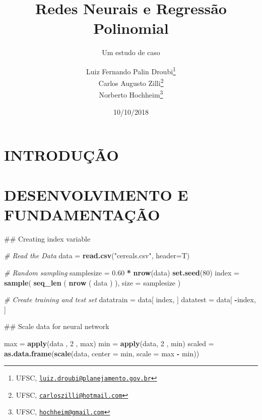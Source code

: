 \documentclass[a4paper, 12pt]{article}
\title{Redes Neurais e Regressão Polinomial}
\subtitle{Um estudo de caso}
\author{Luiz Fernando Palin Droubi\footnote{UFSC,
  \href{mailto:luiz.droubi@planejamento.gov.br}{\nolinkurl{luiz.droubi@planejamento.gov.br}}} \\ Carlos Augusto Zilli\footnote{UFSC,
  \href{mailto:carloszilli@hotmail.com}{\nolinkurl{carloszilli@hotmail.com}}} \\ Norberto Hochheim\footnote{UFSC,
  \href{mailto:hochheim@gmail.com}{\nolinkurl{hochheim@gmail.com}}}}
\date{10/10/2018}
\newenvironment{Shaded}{\begin{snugshade}}{\end{snugshade}}
\newcommand{\KeywordTok}[1]{\textcolor[rgb]{0.13,0.29,0.53}{\textbf{#1}}}
\newcommand{\DataTypeTok}[1]{\textcolor[rgb]{0.13,0.29,0.53}{#1}}
\newcommand{\DecValTok}[1]{\textcolor[rgb]{0.00,0.00,0.81}{#1}}
\newcommand{\FloatTok}[1]{\textcolor[rgb]{0.00,0.00,0.81}{#1}}
\newcommand{\StringTok}[1]{\textcolor[rgb]{0.31,0.60,0.02}{#1}}
\newcommand{\CommentTok}[1]{\textcolor[rgb]{0.56,0.35,0.01}{\textit{#1}}}
\newcommand{\OperatorTok}[1]{\textcolor[rgb]{0.81,0.36,0.00}{\textbf{#1}}}
\newcommand{\NormalTok}[1]{#1}
\begin{document}
\maketitle

\section{INTRODUÇÃO}\label{introducao}

\section{DESENVOLVIMENTO E
FUNDAMENTAÇÃO}\label{desenvolvimento-e-fundamentacao}

\begin{Shaded}
\begin{Highlighting}[]
\NormalTok{## Creating index variable }

\CommentTok{# Read the Data}
\NormalTok{data =}\StringTok{ }\KeywordTok{read.csv}\NormalTok{(}\StringTok{"cereals.csv"}\NormalTok{, }\DataTypeTok{header=}\NormalTok{T)}

\CommentTok{# Random sampling}
\NormalTok{samplesize =}\StringTok{ }\FloatTok{0.60} \OperatorTok{*}\StringTok{ }\KeywordTok{nrow}\NormalTok{(data)}
\KeywordTok{set.seed}\NormalTok{(}\DecValTok{80}\NormalTok{)}
\NormalTok{index =}\StringTok{ }\KeywordTok{sample}\NormalTok{( }\KeywordTok{seq_len}\NormalTok{ ( }\KeywordTok{nrow}\NormalTok{ ( data ) ), }\DataTypeTok{size =}\NormalTok{ samplesize )}

\CommentTok{# Create training and test set}
\NormalTok{datatrain =}\StringTok{ }\NormalTok{data[ index, ]}
\NormalTok{datatest =}\StringTok{ }\NormalTok{data[ }\OperatorTok{-}\NormalTok{index, ]}
\end{Highlighting}
\end{Shaded}

\begin{Shaded}
\begin{Highlighting}[]
\NormalTok{## Scale data for neural network}

\NormalTok{max =}\StringTok{ }\KeywordTok{apply}\NormalTok{(data , }\DecValTok{2}\NormalTok{ , max)}
\NormalTok{min =}\StringTok{ }\KeywordTok{apply}\NormalTok{(data, }\DecValTok{2}\NormalTok{ , min)}
\NormalTok{scaled =}\StringTok{ }\KeywordTok{as.data.frame}\NormalTok{(}\KeywordTok{scale}\NormalTok{(data, }\DataTypeTok{center =}\NormalTok{ min, }\DataTypeTok{scale =}\NormalTok{ max }\OperatorTok{-}\StringTok{ }\NormalTok{min))}
\end{Highlighting}
\end{Shaded}
\end{document}
